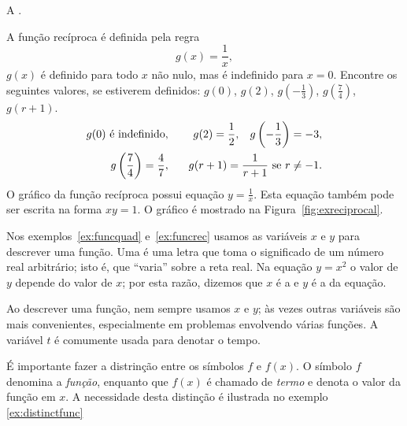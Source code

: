\documentclass{svmono}
\begin{document}
\begin{example}\label{ex:funcrec}
A .

A função recíproca é definida pela regra
\[
  g(x) = \frac{1}{x},
\]
$g(x)$ é definido para todo $x$ não nulo, mas é indefinido para
$x = 0$. Encontre os seguintes valores, se estiverem definidos:
$g(0)$, $g(2)$, $g\left(-\frac{1}{3}\right)$,
$g\left(\frac{7}{4}\right)$, $g(r+1)$.
\begin{eqnarray*}
  g(0) \text{ é indefinido}, & \hspace{2ex} & g(2) = \frac{1}{2}, \hspace{2ex} g\left(-\frac{1}{3}\right) = -3, \\
  g\left(\frac{7}{4}\right) = \frac{4}{7}, & & g(r+1) = \frac{1}{r + 1} \text{ se } r \ne -1.
\end{eqnarray*}
O gráfico da função recíproca possui equação $y = \frac{1}{x}$. Esta
equação também pode ser escrita na forma $x y = 1$. O gráfico é
mostrado na Figura~\ref{fig:exreciprocal}.
\end{example}

Nos exemplos~\ref{ex:funcquad} e~\ref{ex:funcrec} usamos as variáveis
$x$ e $y$ para descrever uma função. Uma  é uma
letra que toma o significado de um número real arbitrário; isto é,
que ``varia'' sobre a reta real. Na equação $y = x^2$ o valor de $y$
depende do valor de $x$; por esta razão, dizemos que $x$ é a
 e $y$ é a
 da equação.

Ao descrever uma função, nem sempre usamos $x$ e $y$;
às vezes outras variáveis são mais convenientes, especialmente
em problemas envolvendo várias funções. A variável $t$ é comumente
usada para denotar o tempo.

É importante fazer a distrinção entre os símbolos $f$ e 
$f(x)$. O símbolo $f$ denomina a \emph{função}, enquanto que
$f(x)$ é chamado de \emph{termo} e denota o valor da função
em $x$. A necessidade desta distinção é ilustrada no exemplo~%
\ref{ex:distinctfunc}
\end{document}
